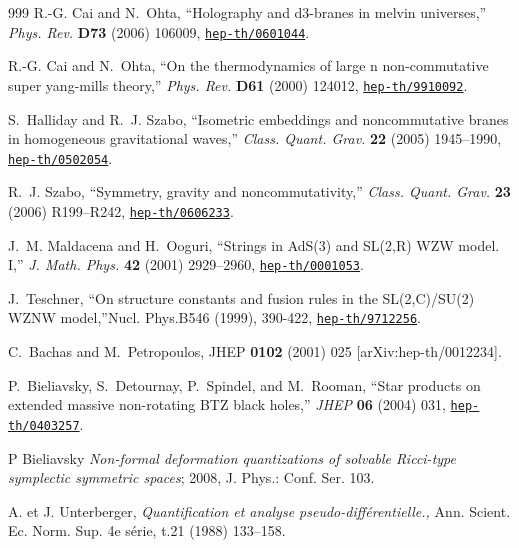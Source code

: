 \documentclass{article}
\begin{document}
\begin{thebibliography}{999}
R.-G. Cai and N.~Ohta, ``Holography and d3-branes in melvin universes,'' {\em
  Phys. Rev.} {\bf D73} (2006) 106009,
\href{http://www.arXiv.org/abs/hep-th/0601044}{{\tt hep-th/0601044}}.

R.-G. Cai and N.~Ohta, ``On the thermodynamics of large n non-commutative super
  yang-mills theory,'' {\em Phys. Rev.} {\bf D61} (2000) 124012,
\href{http://www.arXiv.org/abs/hep-th/9910092}{{\tt hep-th/9910092}}.

S.~Halliday and R.~J. Szabo, ``Isometric embeddings and noncommutative branes
  in homogeneous gravitational waves,'' {\em Class. Quant. Grav.} {\bf 22}
  (2005) 1945--1990,
\href{http://www.arXiv.org/abs/hep-th/0502054}{{\tt hep-th/0502054}}.

R.~J. Szabo, ``Symmetry, gravity and noncommutativity,'' {\em Class. Quant.
  Grav.} {\bf 23} (2006) R199--R242,
\href{http://www.arXiv.org/abs/hep-th/0606233}{{\tt hep-th/0606233}}.

J.~M. Maldacena and H.~Ooguri, ``Strings in {AdS(3) and SL(2,R) WZW model.
  I},'' {\em J. Math. Phys.} {\bf 42} (2001) 2929--2960,
\href{http://www.arXiv.org/abs/hep-th/0001053}{{\tt hep-th/0001053}}.


J.~Teschner, ``On structure constants and fusion rules in the SL(2,C)/SU(2) WZNW  model,''Nucl. Phys.B546 (1999), 390-422, \href{http://www.arXiv.org/abs/hep-th/0001053}{{\tt hep-th/9712256}}.


  C.~Bachas and M.~Petropoulos,
  JHEP {\bf 0102} (2001) 025
  [arXiv:hep-th/0012234].


P.~Bieliavsky, S.~Detournay, P.~Spindel, and M.~Rooman, ``Star products on
  extended massive non-rotating {BTZ} black holes,'' {\em JHEP} {\bf 06} (2004)
  031,
\href{http://www.arXiv.org/abs/hep-th/0403257}{{\tt hep-th/0403257}}.   


 P Bieliavsky {\sl Non-formal deformation quantizations of solvable Ricci-type symplectic symmetric spaces}; 2008,  J. Phys.: Conf. Ser. 103.   

A. et J. Unterberger, {\sl Quantification et analyse pseudo-diff\'erentielle., } Ann. Scient.
  Ec. Norm. Sup. 4e s\'erie, t.21 (1988) 133--158.
  

\end{thebibliography}
\end{document}
